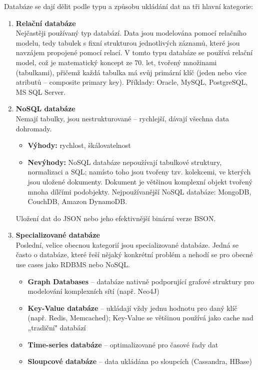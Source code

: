 \documentclass[12pt,a4paper]{article}
\begin{document}
Databáze se dají dělit podle typu a způsobu ukládání dat na tři hlavní kategorie:

\begin{enumerate}
  \item \textbf{Relační databáze} \\
    Nejčastěji používaný typ databází. Data jsou modelována pomocí relačního modelu, tedy tabulek
    s fixní strukturou jednotlivých záznamů, které jsou navzájem propojené pomocí relací.
    V tomto typu databáze se používá relační model, což je matematický koncept ze 70. let, tvořený
    množinami (tabulkami), přičemž každá tabulka má svůj primární klíč (jeden nebo více atributů --
    composite primary key). Příklady: Oracle, MySQL, PostgreSQL, MS SQL Server.

  \item \textbf{NoSQL databáze} \\
    Nemají tabulky, jsou nestrukturované -- rychlejší, dávají všechna data dohromady.
    \begin{itemize}
      \item \textbf{Výhody:} rychlost, škálovatelnost
      \item \textbf{Nevýhody:} NoSQL databáze nepoužívají tabulkové struktury, normalizaci a SQL;
        namísto toho jsou tvořeny tzv. kolekcemi, ve kterých jsou uložené dokumenty. Dokument je
        většinou komplexní objekt tvořený mnoha dílčími podobjekty. Nejpoužívanější NoSQL databáze:
        MongoDB, CouchDB, Amazon DynamoDB.
    \end{itemize}
    Uložení dat do JSON nebo jeho efektivnější binární verze BSON.

  \item \textbf{Specializované databáze} \\
    Poslední, velice obecnou kategorií jsou specializované databáze. Jedná se často o databáze, které
    řeší nějaký konkrétní problém a nehodí se pro obecné use cases jako RDBMS nebo NoSQL.
    \begin{itemize}
      \item \textbf{Graph Databases} -- databáze nativně podporující grafové struktury pro modelování
        komplexních sítí (např. Neo4J)
      \item \textbf{Key-Value databáze} -- ukládají vždy jednu hodnotu pro daný klíč (např. Redis,
        Memcached); Key-Value se většinou používá jako cache nad „tradiční" databází
      \item \textbf{Time-series databáze} -- optimalizované pro časové řady dat
      \item \textbf{Sloupcové databáze} -- data ukládána po sloupcích (Cassandra, HBase)
    \end{itemize}
\end{enumerate}
\end{document}
